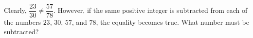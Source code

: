 Clearly, $\dfrac{23}{30}\neq\dfrac{57}{78}$. However, if the same positive integer is subtracted from each of the numbers $23$, $30$, $57$, and $78$, the equality becomes true. What number must be subtracted?
